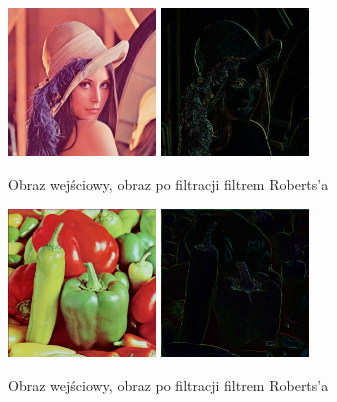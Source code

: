 \documentclass[final,a4paper,openany,12pt]{mwbk}
\begin{document}
\begin{figure}[H]
	\begin{center}
		\includegraphics[width=0.35\textwidth]{lena_color}
		\includegraphics[width=0.35\textwidth]{lena_color_highpassRoberts_result}
	\end{center}
	\caption{Obraz wejściowy, obraz po filtracji filtrem Roberts'a}
\end{figure}

\begin{figure}[H]
	\begin{center}
		\includegraphics[width=0.35\textwidth]{peppers_color}
		\includegraphics[width=0.35\textwidth]{peppers_color_highpassRoberts_result}
	\end{center}
	\caption{Obraz wejściowy, obraz po filtracji filtrem Roberts'a}
\end{figure}
\newpage
\end{document}
